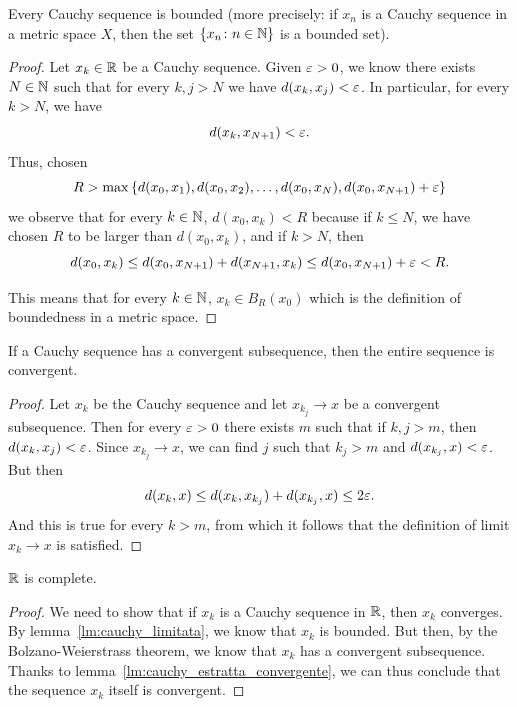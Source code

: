 \begin{lemma}
\label{lm:cauchy_limitata}
Every Cauchy sequence is bounded
(more precisely: if $x_n$ is a Cauchy sequence in a metric space $X$, then the
set ${\left\{ x_n\colon n\in {\mathbb N} \right\}}$
is a bounded set).
\end{lemma}
%
\begin{proof}
Let $x_k \in {\mathbb R}$ be a Cauchy sequence.
Given $\varepsilon>0$, we know there exists $N\in {\mathbb N}$
such that for every $k,j>N$ we have
$d(x_k,x_j) < \varepsilon$. 
In particular, for every $k>N$, we have
\[
  d(x_k, x_{N+1}) < \varepsilon.
\]
Thus, chosen
\[
    R > \max{\left\{ d(x_0,x_1), d(x_0,x_2), \dots, d(x_0,x_N), d(x_0, x_{N+1})
  + \varepsilon\right\}}
\]
we observe that for every $k\in {\mathbb N}$, $d(x_0, x_k)< R$ because 
if $k \le N$, we have chosen $R$ to be larger than $d(x_0,x_k)$, and if $k > N$,
then
\[
  d(x_0,x_k) \le d(x_0,x_{N+1}) + d(x_{N+1},x_k)
    \le d(x_0,x_{N+1}) + \varepsilon < R.
\]

This means that for every $k\in {\mathbb N}$, $x_k \in B_{R}(x_0)$ 
which is the definition of boundedness in a
metric space.
\end{proof}

\begin{lemma}
\label{lm:cauchy_estratta_convergente}
If a Cauchy sequence has a convergent subsequence, then the entire sequence is
convergent.
\end{lemma}
%
\begin{proof}
Let $x_k$ be the Cauchy sequence and let $x_{k_j}\to x$ be a convergent
subsequence.
Then for every $\varepsilon>0$
there exists $m$ such that if $k,j>m$, then $d(x_k ,x_j) < \varepsilon$.
Since $x_{k_j} \to x$, we can find $j$ such that $k_j > m$ and $d(x_{k_j},x) <
\varepsilon$. But then
\[
  d(x_k,x) \le d(x_k, x_{k_j}) + d(x_{k_j},x)
   \le 2 \varepsilon.
\]
And this is true for every $k > m$, from which it follows that the definition of
limit $x_k \to x$ is satisfied.
\end{proof}

\begin{theorem}[completeness of $\RR$]
\mymark{***}%
%
%
\label{th:R-completo}%
$\RR$ is complete.
\end{theorem}
%
\begin{proof}
\mymark{***}
We need to show that if $x_k$ is a Cauchy sequence in $\RR$, then $x_k$
converges.
By lemma~\ref{lm:cauchy_limitata}, we know that $x_k$ is bounded.
But then, by the Bolzano-Weierstrass theorem, we know that $x_k$ has
a convergent subsequence.
Thanks to lemma~\ref{lm:cauchy_estratta_convergente}, we can thus conclude
that the sequence $x_k$ itself is convergent.
\end{proof}

